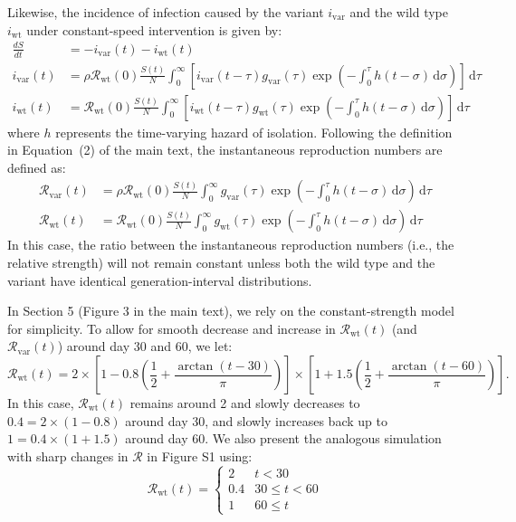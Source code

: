 \documentclass[12pt]{article}
\newcommand{\vvvar}{\mathrm{var}}
\newcommand{\wwwt}{\mathrm{wt}}
\newcommand{\Rx}[1]{\ensuremath{{\mathcal R}_{#1}}\xspace}
\newcommand{\RR}{\ensuremath{{\mathcal R}}\xspace}
\newcommand{\Rw}{\Rx{\wwwt}}
\newcommand{\Rv}{\Rx{\vvvar}}
\newcommand{\dd}[1]{\ensuremath{\, \mathrm{d}#1}}
\newcommand{\dtau}{\dd{\tau}}
\newcommand{\dsigma}{\dd{\sigma}}
\newcommand{\ix}[1]{\ensuremath{{i}_{#1}}\xspace}
\newcommand{\iw}{\ix{\wwwt}}
\newcommand{\iv}{\ix{\vvvar}}
\begin{document}
Likewise, the incidence of infection caused by the variant $\iv$ and the wild type $\iw$ under constant-speed intervention is given by:
\begin{align}
\frac{dS}{dt} &= - \iv(t) - \iw(t)\\
\iv(t) &= \rho  \Rw(0) \frac{S(t)}{N} \int_{0}^\infty \left[\iv(t-\tau) g_{\mathrm{var}}(\tau) \exp \left(- \int_0^\tau h(t-\sigma) \dsigma \right)\right] \dtau\\
\iw(t) &= \Rw(0) \frac{S(t)}{N} \int_{0}^\infty \left[\iw(t-\tau) g_{\mathrm{wt}}(\tau) \exp \left(- \int_0^\tau h(t-\sigma) \dsigma \right)\right] \dtau
\end{align}
where $h$ represents the time-varying hazard of isolation.
Following the definition in Equation~(2) of the main text, the instantaneous reproduction numbers are defined as:
\begin{align}
\Rv(t) &= \rho \Rw(0)  \frac{S(t)}{N} \int_{0}^\infty g_{\mathrm{var}}(\tau) \exp \left(- \int_0^\tau h(t-\sigma) \dsigma \right) \dtau \\
\Rw(t) &= \Rw(0)  \frac{S(t)}{N} \int_{0}^\infty g_{\mathrm{wt}}(\tau) \exp \left(- \int_0^\tau h(t-\sigma) \dsigma \right) \dtau
\end{align}
In this case, the ratio between the instantaneous reproduction numbers (i.e., the relative strength) will not remain constant unless both the wild type and the variant have identical generation-interval distributions.

In Section 5 (Figure 3 in the main text), we rely on the constant-strength model for simplicity.
To allow for smooth decrease and increase in $\Rw(t)$ (and $\Rv(t)$) around day 30 and 60, we let:
\begin{equation}
\Rw(t) = 2 \times \left[1 - 0.8 \left(\frac{1}{2} + \frac{\arctan(t-30)}{\pi} \right) \right] \times \left[1 + 1.5 \left(\frac{1}{2} + \frac{\arctan(t-60)}{\pi} \right) \right].
\end{equation}
In this case, $\Rw(t)$ remains around 2 and slowly decreases to $0.4 = 2 \times (1-0.8)$ around day 30, and slowly increases back up to $1 = 0.4 \times (1 + 1.5)$ around day 60.
We also present the analogous simulation with sharp changes in $\RR$ in Figure S1 using:
\begin{equation}
\Rw(t) = \begin{cases}
2 & t < 30\\
0.4 & 30 \leq t < 60\\
1 & 60 \leq t 
\end{cases}
\end{equation}
\end{document}
